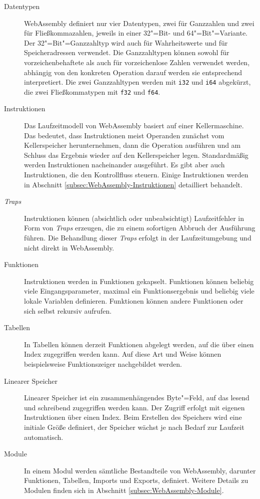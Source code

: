 \begin{description}
    \item[Datentypen] WebAssembly definiert nur vier Datentypen, zwei für Ganzzahlen und zwei für Fließkommazahlen, jeweils in einer 32"=Bit- und 64"=Bit"=Variante. Der 32"=Bit"=Ganzzahltyp wird auch für Wahrheitswerte und für Speicheradressen verwendet. Die Ganzzahltypen können sowohl für vorzeichenbehaftete als auch für vorzeichenlose Zahlen verwendet werden, abhängig von den konkreten Operation darauf werden sie entsprechend interpretiert. Die zwei Ganzzahltypen werden mit \lstinline{i32} und \lstinline{i64} abgekürzt, die zwei Fließkommatypen mit \lstinline{f32} und \lstinline{f64}.
    \item[Instruktionen] Das Laufzeitmodell von WebAssembly basiert auf einer Kellermaschine. Das bedeutet, dass Instruktionen meist Operanden zunächst vom Kellerspeicher herunternehmen, dann die Operation ausführen und am Schluss das Ergebnis wieder auf den Kellerspeicher legen. Standardmäßig werden Instruktionen nacheinander ausgeführt. Es gibt aber auch Instruktionen, die den Kontrollfluss steuern. Einige Instruktionen werden in Abschnitt \ref{subsec:WebAssembly-Instruktionen} detailliert behandelt.
    \item[\emph{Traps}] Instruktionen können (absichtlich oder unbeabsichtigt) Laufzeitfehler in Form von \emph{Traps} erzeugen, die zu einem sofortigen Abbruch der Ausführung führen. Die Behandlung dieser \emph{Traps} erfolgt in der Laufzeitumgebung und nicht direkt in WebAssembly.
    \item[Funktionen] Instruktionen werden in Funktionen gekapselt. Funktionen können beliebig viele Eingangsparameter, maximal ein Funktionsergebnis und beliebig viele lokale Variablen definieren. Funktionen können andere Funktionen oder sich selbst rekursiv aufrufen.
    \item[Tabellen] In Tabellen können derzeit Funktionen abgelegt werden, auf die über einen Index zugegriffen werden kann. Auf diese Art und Weise können beispielsweise Funktionszeiger nachgebildet werden. 
    \item[Linearer Speicher] Linearer Speicher ist ein zusammenhängendes Byte"=Feld, auf das lesend und schreibend zugegriffen werden kann. Der Zugriff erfolgt mit eigenen Instruktionen über einen Index. Beim Erstellen des Speichers wird eine initiale Größe definiert, der Speicher wächst je nach Bedarf zur Laufzeit automatisch.
    \item[Module] In einem Modul werden sämtliche Bestandteile von WebAssembly, darunter Funktionen, Tabellen, Imports und Exports, definiert. Weitere Details zu Modulen finden sich in Abschnitt \ref{subsec:WebAssembly-Module}.
\end{description}

